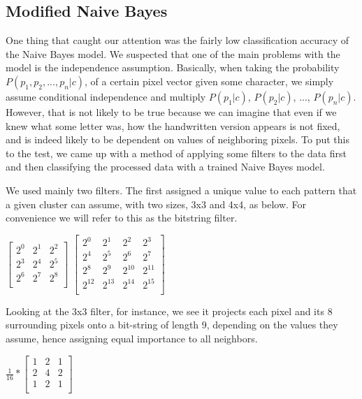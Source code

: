 \documentclass{article} %
\begin{document}
\subsection{Modified Naive Bayes}

One thing that caught our attention was the fairly low classification accuracy of the Naive Bayes model. We suspected that one of the main problems with the model is the independence assumption. Basically, when taking the probability $P(p_1, p_2, ..., p_n|c)$, of a certain pixel vector given some character, we simply assume conditional independence and multiply $P(p_1|c)$, $P(p_2|c)$, ..., $P(p_n|c)$. However, that is not likely to be true because we can imagine that even if we knew what some letter was, how the handwritten version appears is not fixed, and is indeed likely to be dependent on values of neighboring pixels. To put this to the test, we came up with a method of applying some filters to the data first and then classifying the processed data with a trained Naive Bayes model.

We used mainly two filters. The first assigned a unique value to each pattern that a given cluster can assume, with two sizes, 3x3 and 4x4, as below. For convenience we will refer to this as the bitstring filter.

$\left[
\begin{array}{ccc}
2^0&2^1&2^2\\
2^3&2^4&2^5\\
2^6&2^7&2^8\\
\end{array}
\right]$
$\left[
\begin{array}{cccc}
2^0&2^1&2^2&2^3\\
2^4&2^5&2^6&2^7\\
2^8&2^9&2^{10}&2^{11}\\
2^{12}&2^{13}&2^{14}&2^{15}\\
\end{array}
\right]$

Looking at the 3x3 filter, for instance, we see it projects each pixel and its 8 surrounding pixels onto a bit-string of length 9, depending on the values they assume, hence assigning equal importance to all neighbors. 

$\frac{1}{16}*\left[
\begin{array}{ccc}
1&2&1\\
2&4&2\\
1&2&1\\
\end{array}
\right]$
\end{document}
